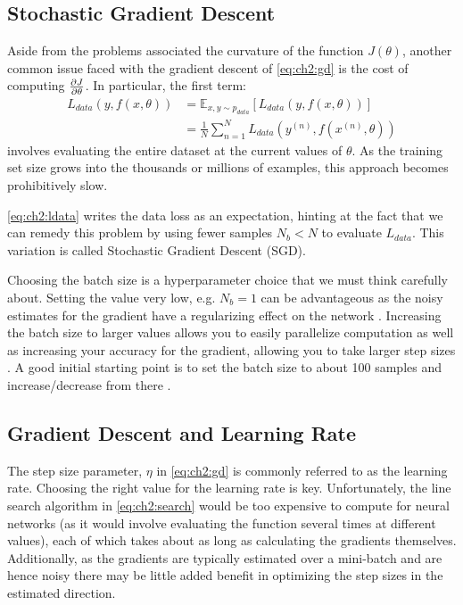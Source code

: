 \subsection{Stochastic Gradient Descent}
Aside from the problems associated the curvature of the function $J(\theta)$,
another common issue faced with the gradient descent of \eqref{eq:ch2:gd} is the
cost of computing $\frac{\partial J}{\partial \theta}$. In particular, the first term:
\begin{align}\label{eq:ch2:ldata}
  L_{data}(y, f(x, \theta)) &= \mathbb{E}_{x,y \sim p_{data}}\left[ L_{data}(y, f(x, \theta))\right] \\
                            &= \frac{1}{N}\sum_{n=1}^N L_{data}\left(y^{(n)}, f(x^{(n)}, \theta)\right) 
\end{align}
involves evaluating the entire dataset at the current values of $\theta$. As the
training set size grows into the thousands or millions of examples, this
approach becomes prohibitively slow. 

\eqref{eq:ch2:ldata} writes the data loss as an expectation, hinting at the fact that 
we can remedy this problem by using fewer samples $N_b < N$ to evaluate $L_{data}$. 
This variation is called Stochastic Gradient Descent (SGD).

Choosing the batch size is a hyperparameter choice that we must think carefully
about. Setting the value very low, e.g. $N_b = 1$ can be advantageous as the
noisy estimates for the gradient have a regularizing effect on the network
\cite{wilson_general_2003}. Increasing the batch size to larger values allows
you to easily parallelize computation as well as increasing your accuracy for
the gradient, allowing you to take larger step sizes \cite{smith_dont_2017}.
A good initial starting point is to set the batch size to about 100 samples and
increase/decrease from there \cite{goodfellow_deep_2016}.

\subsection{Gradient Descent and Learning Rate}
The step size parameter, $\eta$ in \eqref{eq:ch2:gd} is commonly referred to as
the learning rate. Choosing the right value for the learning rate is key.
Unfortunately, the line search algorithm in \eqref{eq:ch2:search} would be too
expensive to compute for neural networks (as it would involve evaluating the
function several times at different values), each of which takes about as long
as calculating the gradients themselves. Additionally, as the gradients are
typically estimated over a mini-batch and are hence noisy there may be
little added benefit in optimizing the step sizes in the estimated direction. 

